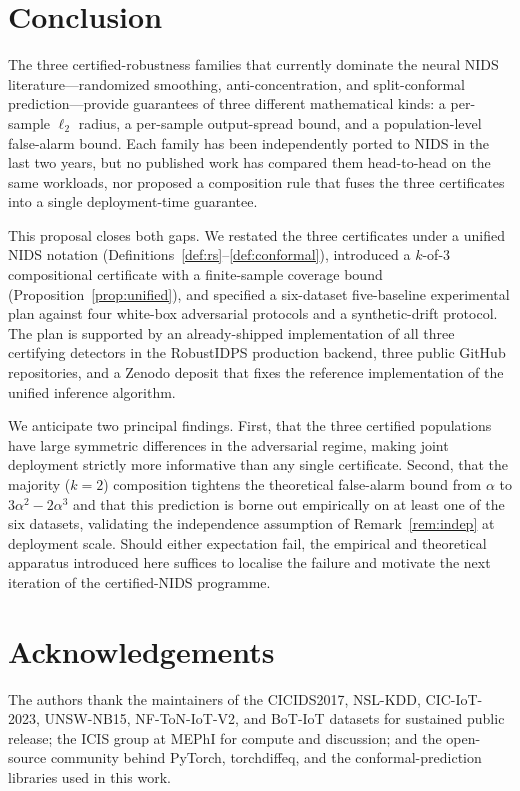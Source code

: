 \documentclass[journal,twoside]{IEEEtran}
\begin{document}
\section{Conclusion}\label{sec:conclusion}
The three certified-robustness families that currently dominate the
neural NIDS literature---randomized smoothing, anti-concentration,
and split-conformal prediction---provide guarantees of three different
mathematical kinds: a per-sample $\ell_2$ radius, a per-sample
output-spread bound, and a population-level false-alarm bound. Each
family has been independently ported to NIDS in the last two years, but
no published work has compared them head-to-head on the same workloads,
nor proposed a composition rule that fuses the three certificates into
a single deployment-time guarantee.

This proposal closes both gaps. We restated the three certificates
under a unified NIDS notation
(Definitions~\ref{def:rs}--\ref{def:conformal}), introduced a
$k$-of-$3$ compositional certificate with a finite-sample coverage
bound (Proposition~\ref{prop:unified}), and specified a six-dataset
five-baseline experimental plan against four white-box adversarial
protocols and a synthetic-drift protocol. The plan is supported by an
already-shipped implementation of all three certifying detectors in
the RobustIDPS production backend, three public GitHub repositories,
and a Zenodo deposit that fixes the reference implementation of the
unified inference algorithm.

We anticipate two principal findings. First, that the three certified
populations have large symmetric differences in the adversarial regime,
making joint deployment strictly more informative than any single
certificate. Second, that the majority ($k=2$) composition tightens
the theoretical false-alarm bound from $\alpha$ to $3\alpha^2 -
2\alpha^3$ and that this prediction is borne out empirically on at
least one of the six datasets, validating the independence assumption
of Remark~\ref{rem:indep} at deployment scale. Should either
expectation fail, the empirical and theoretical apparatus introduced
here suffices to localise the failure and motivate the next iteration
of the certified-NIDS programme.

\section*{Acknowledgements}
The authors thank the maintainers of the CICIDS2017, NSL-KDD,
CIC-IoT-2023, UNSW-NB15, NF-ToN-IoT-V2, and BoT-IoT datasets for
sustained public release; the ICIS group at MEPhI for compute and
discussion; and the open-source community behind PyTorch,
torchdiffeq, and the conformal-prediction libraries used in this work.
\end{document}

